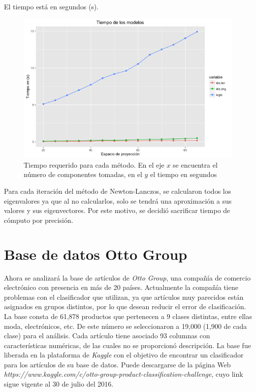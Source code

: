 El tiempo está en segundos (s).

\begin{figure}[!ht]
  \centering
  \includegraphics[width=.95\textwidth]{Figures/Chapter4_profilingStateFarm.png} 
  \caption[Tiempo de cómputo (State Farm)]
  {Tiempo requerido para cada método. En el eje $x$ se encuentra el número de componentes tomadas, en el $y$ el tiempo en segundos}
\end{figure}

Para cada iteración del método de Newton-Lanczos, se calcularon todos los eigenvalores ya que al no calcularlos, solo se tendrá una aproximación a sus valores y sus eigenvectores. Por este motivo, se decidió sacrificar tiempo de cómputo por precisión.

\section{Base de datos Otto Group}


Ahora se analizará la base de artículos de \textit{Otto Group}, una compañía de comercio electrónico con presencia en más de 20 países. Actualmente la compañía tiene problemas con el clasificador que utilizan, ya que artículos muy parecidos están asignados en grupos distintos, por lo que desean reducir el error de clasificación. La base consta de 61,878 productos que pertenecen a 9 clases distintas, entre ellas moda, electrónicos, etc. De este número se seleccionaron a 19,000 (1,900 de cada clase) para el análisis. Cada artículo tiene asociado 93 columnas con características numéricas, de las cuales no se proporcionó descripción. La base fue liberada en la plataforma de \textit{Kaggle} con el objetivo de encontrar un clasificador para los artículos de su base de datos. Puede descargarse de la página Web \textit{https://www.kaggle.com/c/otto-group-product-classification-challenge}, cuyo link sigue vigente al 30 de julio del 2016.

